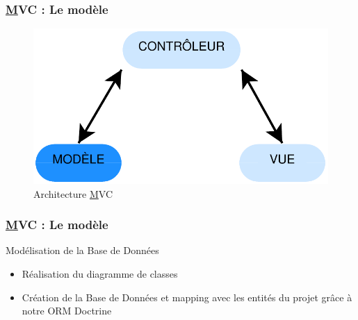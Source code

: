 \speaker{\Michel}

\begin{frame}
\frametitle{\underline{M}VC : Le modèle}
\begin{figure}[!h]
	\begin{center}
	\includegraphics[scale=0.5]{images/mvcModele}
	\caption{Architecture \underline{M}VC}
	\end{center}
\end{figure}
\end{frame}


\begin{frame}
	\frametitle{\underline{M}VC : Le modèle}
	\begin{block}{Modélisation de la Base de Données}	
		\begin{itemize}
			\item Réalisation du diagramme de classes
			\item Création de la Base de Données et mapping avec les entités du projet grâce à notre ORM Doctrine
		\end{itemize}
	\end{block}
\end{frame}


